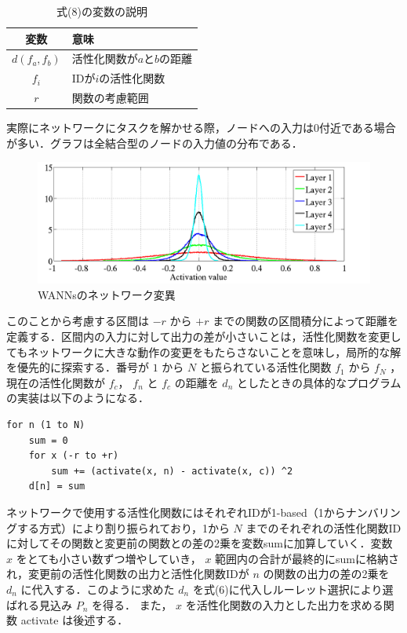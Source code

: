 \begin{table}[h]
    \caption{式(8)の変数の説明}
    \centering
    \begin{tabular}{cl}
        \hline
        変数  & 意味 \\
        \hline \hline
        $d(f_{a}, f_{b})$ & 活性化関数が$a$と$b$の距離                 \\
        $f_{i}$           & IDが$i$の活性化関数                        \\
        $r$               & 関数の考慮範囲                             \\
        \hline
    \end{tabular}
\end{table}

実際にネットワークにタスクを解かせる際，ノードへの入力は0付近である場合が多い．グラフは全結合型のノードの入力値の分布である\cite{ノード入力}．

\begin{figure}[h]
    \begin{center}
        \includegraphics[width=120mm]{img/expinput.png}
        \caption{WANNsのネットワーク変異}
    \end{center}
\end{figure}

このことから考慮する区間は $ -r $ から $ +r $ までの関数の区間積分によって距離を定義する．区間内の入力に対して出力の差が小さいことは，活性化関数を変更してもネットワークに大きな動作の変更をもたらさないことを意味し，局所的な解を優先的に探索する．番号が $ 1 $ から $ N $ と振られている活性化関数 $ f_1 $ から $ f_N $ ，現在の活性化関数が $ f_c $， $ f_n $ と $ f_c $ の距離を $ d_n $ としたときの具体的なプログラムの実装は以下のようになる．

\begin{lstlisting}[caption=区間積分差のプログラム]
for n (1 to N)
    sum = 0
    for x (-r to +r)
        sum += (activate(x, n) - activate(x, c)) ^2
    d[n] = sum
\end{lstlisting}

ネットワークで使用する活性化関数にはそれぞれIDが1-based（1からナンバリングする方式）により割り振られており，1から $ N $ までのそれぞれの活性化関数IDに対してその関数と変更前の関数との差の2乗を変数sumに加算していく．変数 $ x $ をとても小さい数ずつ増やしていき， $ x $ 範囲内の合計が最終的にsumに格納され，変更前の活性化関数の出力と活性化関数IDが $ n $ の関数の出力の差の2乗を $ d_n $ に代入する．このように求めた $ d_n $ を式(6)に代入しルーレット選択により選ばれる見込み $ P_n $ を得る．
また， $ x $ を活性化関数の入力とした出力を求める関数 activate は後述する．


